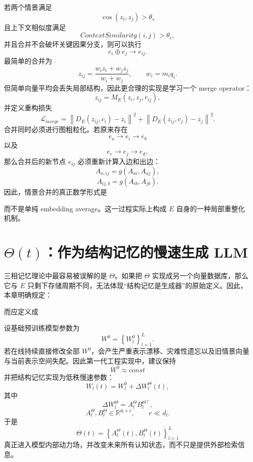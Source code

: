 若两个情景满足
\[
\cos(z_i,z_j)
>
\theta_s
\]
且上下文相似度满足
\[
ContextSimilarity(i,j)
>
\theta_c,
\]
并且合并不会破坏关键因果分支，则可以执行
\[
e_i\oplus e_j
\rightarrow
e_{ij}.
\]
最简单的合并为
\[
z_{ij}
=
\frac{
w_i z_i+w_j z_j
}{
w_i+w_j
},
\qquad
w_i=m_iq_i.
\]
但简单向量平均会丢失局部结构，因此更合理的实现是学习一个 merge operator：
\[
z_{ij}
=
M_E
\left(
z_i,z_j,r_{ij}
\right),
\]
并定义重构损失
\[
\mathcal{L}_{merge}
=
\left\|
D_E(z_{ij},c_i)-z_i
\right\|^2
+
\left\|
D_E(z_{ij},c_j)-z_j
\right\|^2.
\]
合并同时必须进行图粗粒化。若原来存在
\[
e_a\rightarrow e_i\rightarrow e_b
\]
以及
\[
e_c\rightarrow e_j\rightarrow e_d,
\]
那么合并后的新节点 $e_{ij}$ 必须重新计算入边和出边：
\[
A_{a,ij}
=
g(A_{ai},A_{aj}),
\]
\[
A_{ij,b}
=
g(A_{ib},A_{jb}).
\]
因此，情景合并的真正数学形式是
\begin{statementbox}
\centering
{}
\end{statementbox}
而不是单纯 embedding average。这一过程实际上构成 $E$ 自身的一种局部重整化机制。

\section{$\Theta(t)$：作为结构记忆的慢速生成 LLM}

三相记忆理论中最容易被误解的是 $\Theta$。如果把 $\Theta$ 实现成另一个向量数据库，那么它与 $E$ 只剩下存储周期不同，无法体现“结构记忆是生成器”的原始定义。因此，本章明确规定：
\begin{statementbox}
\centering
{}
\end{statementbox}
而应定义成
\begin{statementbox}
\centering
{}
\end{statementbox}

设基础预训练模型参数为
\[
W^0
=
\left\{
W_l^0
\right\}_{l=1}^{L}.
\]
若在线持续直接修改全部 $W^0$，会产生严重表示漂移、灾难性遗忘以及旧情景向量与当前表示空间失配。因此第一代工程实现中，建议保持
\[
W^0\approx const
\]
并把结构记忆实现为低秩慢速参数：
\[
W_l(t)
=
W_l^0
+
\Delta W_l^\Theta(t),
\]
其中
\[
\Delta W_l^\Theta
=
A_l^\Theta
B_l^{\Theta\top},
\]
\[
A_l^\Theta,B_l^\Theta
\in
\mathbb{R}^{d_l\times r},
\qquad
r\ll d_l.
\]
于是
\[
\Theta(t)
=
\left\{
A_l^\Theta(t),
B_l^\Theta(t)
\right\}_{l=1}^{L}
\]
真正进入模型内部动力场，并改变未来所有认知状态，而不只是提供外部检索信息。

